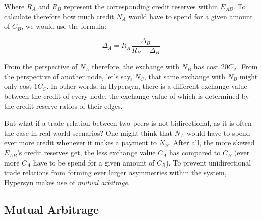 \documentclass{article}
\begin{document}
Where $R_A$ and $R_B$ represent the corresponding credit reserves within $E_{AB}$. To calculate therefore how much credit $N_A$ would have to spend for a given amount of $C_B$, we would use the formula:

\begin{equation}
\label{eq:const_prod4}
 \Delta_A= R_A \frac{\Delta_B}{R_B - \Delta_B}
\end{equation}

From the perspective of $N_A$ therefore, the exchange with $N_B$ has cost $20 C_A$. From the perspective of another node, let's say, $N_C$, that same exchange with $N_B$ might only cost $1 C_C$. In other words, in Hypersyn, there is a different exchange value between the credit of every node, the exchange value of which is determined by the credit reserve ratios of their edges. 

But what if a trade relation between two peers is not bidirectional, as it is often the case in real-world scenarios? One might think that $N_A$ would have to spend ever more credit whenever it makes a payment to $N_B$. After all, the more skewed $E_{AB}$'s credit reserves get, the less exchange value $C_A$ has compared to $C_B$ (ever more $C_A$ have to be spend for a given amount of $C_B$). To prevent unidirectional trade relations from forming ever larger asymmetries within the system, Hypersyn makes use of \textit{mutual arbitrage}.


\subsection{Mutual Arbitrage}
\label{ss: mutual arbitrage}
\end{document}
